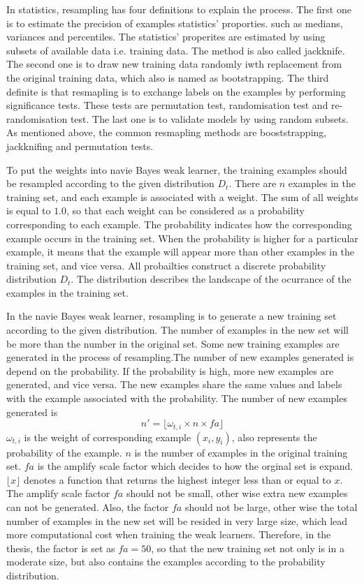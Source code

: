 In statistics, resampling has four definitions to explain the process. The first one is to estimate the precision of examples statistics' proporties. such as medians, variances and percentiles. The statistics' properites are estimated by using subsets of available data i.e. training data. The method is also called jackknife. The second one is to draw new training data randomly iwth replacement from the original training data, which also is named as bootstrapping. The third definite is that resmapling is to exchange labels on the examples by performing significance tests. These tests are permutation test, randomisation test and re-randomisation test. The last one is to validate models by using random subsets. As mentioned above, the common resmapling methods are booststrapping, jackknifing and permutation tests. 

To put the weights into navie Bayes weak learner, the training examples should be resampled according to the given distribution $D_{t}$. There are  $n$ examples in the training set, and each example is associated with a weight. The sum of all weights is equal to $1.0$, so that each weight can be considered as a probability corresponding to each example. The probability indicates how the corresponding example occurs in the training set. When the probability is higher for a particular example, it means that the example will appear more than other examples in the training set, and vice versa. All probailties construct a discrete probability distribution $D_{t}$. The distribution describes the landscape of the ocurrance of the examples in the training set. 

In the navie Bayes weak learner, resampling is to generate a new training set according to the given distribution.  The number of examples in the new set will be more than the number in the original set. Some new training examples are generated in the process of resampling.The number of new examples generated is depend on the probability. If the probability is high, more new examples are generated, and vice versa. The new examples share the same values and labels with the example associated with the probability.  The number of new examples generated is
\begin{equation}\label{eq:newnumofexamples}
 n' = \lfloor \omega_{t,i} \times n \times fa \rfloor
\end{equation}
$\omega_{t,i}$ is the weight of corresponding example $(x_{i},y_{i})$, also represents the probability of the example. $n$ is the number of examples in the original training set. $fa$ is the amplify scale factor which decides to how the orginal set is expand. $\lfloor x \rfloor$ denotes a function that returns the highest integer less than or equal to $x$. The amplify scale factor $fa$ should not be small, other wise extra new examples can not be generated. Also, the factor $fa$ should not be large, other wise the total number of examples in the new set will be resided in very large size, which lead more computational cost when training the weak learners. Therefore, in the thesis, the factor is set as $fa =50$, so that the new training set not only is in a moderate size, but also contains the examples according to the probability distribution.

